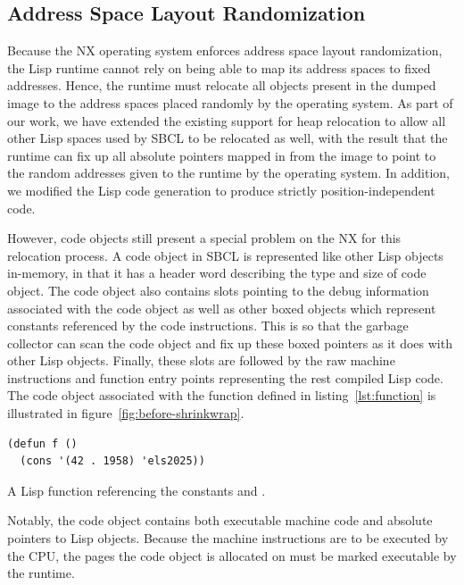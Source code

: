 \documentclass[format=sigconf]{acmart}
\begin{document}
\subsection{Address Space Layout Randomization}
Because the NX operating system enforces address space layout randomization, the Lisp runtime cannot rely on being able to map its address spaces to fixed addresses. Hence, the runtime must relocate all objects present in the dumped image to the address spaces placed randomly by the operating system. As part of our work, we have extended the existing support for heap relocation to allow all other Lisp spaces used by SBCL to be relocated as well, with the result that the runtime can fix up all absolute pointers mapped in from the image to point to the random addresses given to the runtime by the operating system. In addition, we modified the Lisp code generation to produce strictly position-independent code.

However, code objects still present a special problem on the NX for this relocation process. A code object in SBCL is represented like other Lisp objects in-memory, in that it has a header word describing the type and size of code object. The code object also contains slots pointing to the debug information associated with the code object as well as other boxed objects which represent constants referenced by the code instructions. This is so that the garbage collector can scan the code object and fix up these boxed pointers as it does with other Lisp objects. Finally, these slots are followed by the raw machine instructions and function entry points representing the rest compiled Lisp code. The code object associated with the function defined in listing~\ref{lst:function} is illustrated in figure~\ref{fig:before-shrinkwrap}.

\begin{listing}[h]
\begin{verbatim}
(defun f ()
  (cons '(42 . 1958) 'els2025))

\end{verbatim}
\caption{A Lisp function referencing the constants  and .}
\label{lst:function}
\end{listing}

Notably, the code object contains both executable machine code and absolute pointers to Lisp objects. Because the machine instructions are to be executed by the CPU, the pages the code object is allocated on must be marked executable by the runtime.
\end{document}
